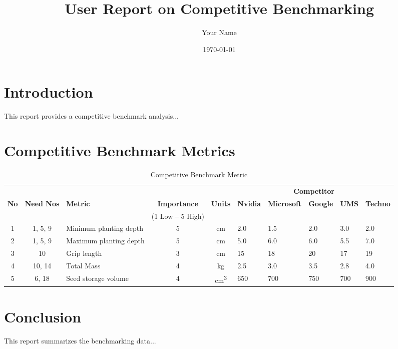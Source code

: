 \documentclass[a4paper,12pt]{report} %
\begin{document}
\title{User Report on Competitive Benchmarking}
\author{Your Name}
\date{\today}
\maketitle

\chapter{Introduction}
This report provides a competitive benchmark analysis...

\chapter{Competitive Benchmark Metrics}






\begin{landscape}
    \thispagestyle{plain}
    \begin{table}[h]
        \centering
        \caption{Competitive Benchmark Metric}
        \small
        \renewcommand{\arraystretch}{1.2}
        \setlength{\tabcolsep}{5pt}

        \begin{tabular}{c c l c c p{2cm} p{2cm} p{2cm} p{2cm} p{2cm}}
            \toprule
            \multicolumn{3}{c}{} & \multicolumn{2}{c}{} & \multicolumn{5}{c}{\textbf{Competitor}} \\
            \cmidrule(lr){6-10}
            \textbf{No} & \textbf{Need Nos} & \textbf{Metric} & \textbf{Importance} & \textbf{Units} & \textbf{Nvidia} & \textbf{Microsoft} & \textbf{Google} & \textbf{UMS} & \textbf{Techno} \\
            & & & (1 Low – 5 High) & & & & & & \\
            \midrule
            1  & 1, 5, 9  & Minimum planting depth & 5 & cm  & 2.0 & 1.5 & 2.0 & 3.0 & 2.0 \\
            2  & 1, 5, 9  & Maximum planting depth & 5 & cm  & 5.0 & 6.0 & 6.0 & 5.5 & 7.0 \\
            3  & 10       & Grip length            & 3 & cm  & 15  & 18  & 20  & 17  & 19  \\
            4  & 10, 14   & Total Mass             & 4 & kg  & 2.5 & 3.0 & 3.5 & 2.8 & 4.0 \\
            5  & 6, 18    & Seed storage volume    & 4 & cm\textsuperscript{3} & 650 & 700 & 750 & 700 & 900 \\
            \bottomrule
        \end{tabular}
    \end{table}
\end{landscape}

\chapter{Conclusion}
This report summarizes the benchmarking data...
\end{document}

